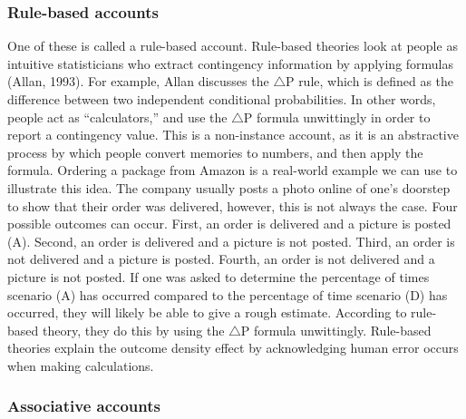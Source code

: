 \documentclass[
  english,
  man,floatsintext]{apa6}
\begin{document}
\hypertarget{rule-based-accounts}{%
\subsubsection{Rule-based accounts}\label{rule-based-accounts}}

One of these is called a rule-based account. Rule-based theories look at people as intuitive statisticians who extract contingency information by applying formulas (Allan, 1993). For example, Allan discusses the \(\triangle\)P rule, which is defined as the difference between two independent conditional probabilities. In other words, people act as ``calculators,'' and use the \(\triangle\)P formula unwittingly in order to report a contingency value. This is a non-instance account, as it is an abstractive process by which people convert memories to numbers, and then apply the formula. Ordering a package from Amazon is a real-world example we can use to illustrate this idea. The company usually posts a photo online of one's doorstep to show that their order was delivered, however, this is not always the case. Four possible outcomes can occur. First, an order is delivered and a picture is posted (A). Second, an order is delivered and a picture is not posted. Third, an order is not delivered and a picture is posted. Fourth, an order is not delivered and a picture is not posted. If one was asked to determine the percentage of times scenario (A) has occurred compared to the percentage of time scenario (D) has occurred, they will likely be able to give a rough estimate. According to rule-based theory, they do this by using the \(\triangle\)P formula unwittingly. Rule-based theories explain the outcome density effect by acknowledging human error occurs when making calculations.

\hypertarget{associative-accounts}{%
\subsubsection{Associative accounts}\label{associative-accounts}}
\end{document}
